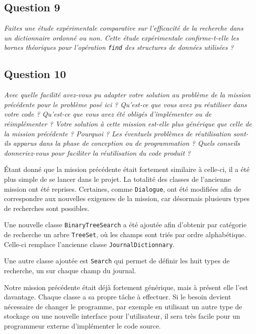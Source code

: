 \documentclass[11pt]{article}
\begin{document}
\subsection*{Question 9}
\textit{Faites une étude expérimentale comparative sur l’efficacité de la recherche dans un dictionnaire ordonné ou non. Cette étude expérimentale confirme-t-elle les bornes théoriques pour l’opération \texttt{find} des structures de données utilisées ?} \\ \medskip




\subsection*{Question 10}
\textit{Avec quelle facilité avez-vous pu adapter votre solution au problème de la mission précédente pour le problème posé ici ? Qu’est-ce que vous avez pu réutiliser dans votre code ? Qu’est-ce que
vous avez été obligés d’implémenter ou de réimplémenter ? Votre solution à cette mission est-elle plus générique que celle de la mission précédente ? Pourquoi ? Les éventuels problèmes de réutilisation sont-ils apparus dans la phase de conception ou de programmation ? Quels conseils donneriez-vous pour faciliter la réutilisation du code produit ?} \\ \medskip

Étant donné que la mission précédente était fortement similaire à celle-ci, il a été plus simple de se lancer dans le projet. 
La totalité des classes de l'ancienne mission ont été reprises. Certaines, comme \verb+Dialogue+, ont été modifiées afin de correspondre aux nouvelles exigences de la mission, car désormais plusieurs types de recherches sont possibles. 

Une nouvelle classe \verb+BinaryTreeSearch+ a été ajoutée afin d'obtenir par catégorie de recherche un arbre \verb+TreeSet+, où les champs sont triés par ordre alphabétique. Celle-ci remplace l'ancienne classe \verb+JournalDictionnary+.

Une autre classe ajoutée est \verb+Search+ qui permet de définir les huit types de recherche, un sur chaque champ du journal.

Notre mission précédente était déjà fortement générique, mais à présent elle l'est davantage. Chaque classe a sa propre tâche à effectuer. Si le besoin devient nécessaire de changer le programme, par exemple en utilisant un autre type de stockage ou une nouvelle interface pour l'utilisateur, il sera très facile pour un programmeur externe d'implémenter le code source.
\end{document}
